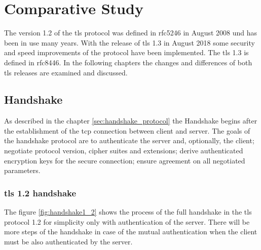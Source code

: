\chapter{Comparative Study}
\label{chap:comparative_study}

The version 1.2 of the \gls{tls} protocol was defined in \gls{rfc}5246 in August 2008 und has been in use many years. With the release of \gls{tls} 1.3 in August 2018 some security and speed improvements of the protocol have been implemented. The \gls{tls} 1.3 is defined in \gls{rfc}8446. In the following chapters the changes and differences of both \gls{tls} releases are examined and discussed.

\section{Handshake}
\label{sec:comparison_handshake}

As described in the chapter \ref{sec:handshake_protocol} the Handshake begins after the establishment of the \gls{tcp} connection between client and server. The goals of the handshake protocol are to authenticate the server and, optionally, the client; negotiate protocol version, cipher suites and extensions; derive authenticated encryption keys for the secure connection; ensure agreement on all negotiated parameters. \cite{Hassenstein}

\subsection{\gls{tls} 1.2 handshake}
\label{subsec:handshake1_2}

The figure \ref{fig:handshake1_2} shows the process of the full handshake in the \gls{tls} protocol 1.2 for simplicity only with authentication of the server. There will be more steps of the handshake in case of the mutual authentication when the client must be also authenticated by the server.

